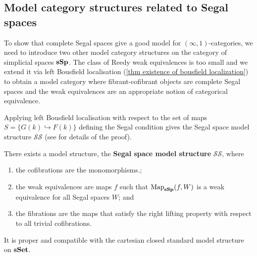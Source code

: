 \begin{refsection}
\subsection{Model category structures related to Segal spaces}

To show that complete Segal spaces give a good model for $(\infty,1)$-categories, we need to introduce two other model category structures on the category of simplicial spaces $\mathbf{sSp}$. The class of Reedy weak equivalences is too small and we extend it via left Bousfield localisation (\ref{thm existence of bousfield localization}) to obtain a model category where fibrant-cofibrant objects are complete Segal spaces and the weak equivalences are an appropriate notion of categorical equivalence.

Applying left Bousfield localisation with respect to the set of maps $S=\{G(k)\hookrightarrow F(k)\}$ defining the Segal condition gives the Segal space model structure $\mathcal{SS}$ (see \cite{rezk-a-model-for-the-homotopy-theory-of-homotopy-theories} for details of the proof).
\begin{thm}
There exists a model structure, the \textbf{Segal space model structure} $\mathcal{SS}$, where
\begin{enumerate}
\item the cofibrations are the monomorphisms.;
\item the weak equivalences are maps $f$ such that $\operatorname{\mathrm{Map}}_{\mathbf{sSp}}(f,W)$ is a weak equivalence for all Segal spaces $W$; and 
\item the fibrations are the maps that satisfy the right lifting property with respect to all trivial cofibrations.
\end{enumerate}
It is proper and compatible with the cartesian closed standard model structure on $\mathbf{sSet}$.
\end{thm}


\end{refsection}
